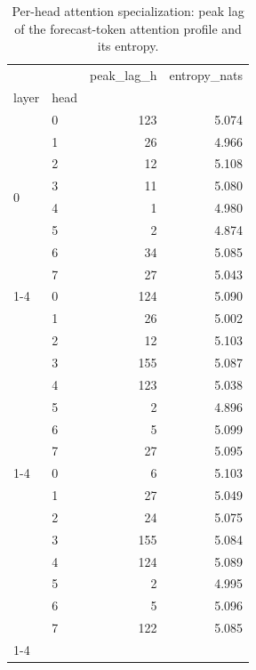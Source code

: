 \begin{table}
\caption{Per-head attention specialization: peak lag of the forecast-token attention profile and its entropy.}
\label{tab:heads}
\begin{tabular}{llrr}
\toprule
 &  & peak\_lag\_h & entropy\_nats \\
layer & head &  &  \\
\midrule
\multirow[t]{8}{*}{0} & 0 & 123 & 5.074 \\
 & 1 & 26 & 4.966 \\
 & 2 & 12 & 5.108 \\
 & 3 & 11 & 5.080 \\
 & 4 & 1 & 4.980 \\
 & 5 & 2 & 4.874 \\
 & 6 & 34 & 5.085 \\
 & 7 & 27 & 5.043 \\
\cline{1-4}
\multirow[t]{8}{*}{1} & 0 & 124 & 5.090 \\
 & 1 & 26 & 5.002 \\
 & 2 & 12 & 5.103 \\
 & 3 & 155 & 5.087 \\
 & 4 & 123 & 5.038 \\
 & 5 & 2 & 4.896 \\
 & 6 & 5 & 5.099 \\
 & 7 & 27 & 5.095 \\
\cline{1-4}
\multirow[t]{8}{*}{2} & 0 & 6 & 5.103 \\
 & 1 & 27 & 5.049 \\
 & 2 & 24 & 5.075 \\
 & 3 & 155 & 5.084 \\
 & 4 & 124 & 5.089 \\
 & 5 & 2 & 4.995 \\
 & 6 & 5 & 5.096 \\
 & 7 & 122 & 5.085 \\
\cline{1-4}
\bottomrule
\end{tabular}
\end{table}
